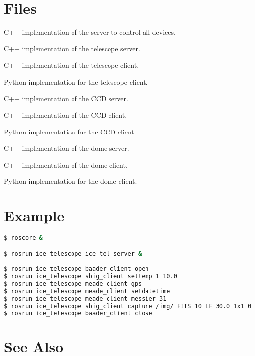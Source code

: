 \documentclass[a4paper,english]{article}
\begin{document}
\section{Files}

\begin{Description}\setlength{\itemsep}{0cm}
\item[\File{ice\_tel\_server}] C++ implementation of the server to control all devices.
\item[\File{meade\_server}] C++ implementation of the telescope server.
\item[\File{meade\_client}] C++ implementation of the telescope client.
\item[\File{meade\_client.py}] Python implementation for the telescope client.
\item[\File{sbig\_server}] C++ implementation of the CCD server.
\item[\File{sbig\_client}] C++ implementation of the CCD client.
\item[\File{sbig\_client.py}] Python implementation for the CCD client.
\item[\File{baader\_server}] C++ implementation of the dome server.
\item[\File{baader\_client}] C++ implementation of the dome client.
\item[\File{baader\_client.py}] Python implementation for the dome client.
\end{Description}


\section{Example}

\begin{lstlisting}[language=bash, frame=single, breaklines=true]
$ roscore &

$ rosrun ice_telescope ice_tel_server &

$ rosrun ice_telescope baader_client open
$ rosrun ice_telescope sbig_client settemp 1 10.0
$ rosrun ice_telescope meade_client gps
$ rosrun ice_telescope meade_client setdatetime
$ rosrun ice_telescope meade_client messier 31
$ rosrun ice_telescope sbig_client capture /img/ FITS 10 LF 30.0 1x1 0 0 0 0 1 1
$ rosrun ice_telescope baader_client close
\end{lstlisting}


\section{See Also}
\end{document}
